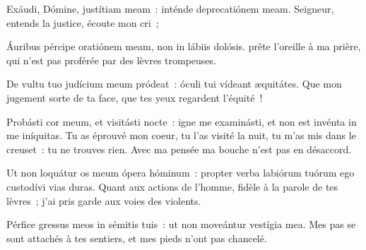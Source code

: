 
\begin{paracol}{2}

\LigneParacol{0cm}
{Exáudi, Dómine, justítiam meam~: \GreStar{} inténde deprecatiónem meam.}
{Seigneur, entends la justice, écoute mon cri~;}

\LigneParacol{0.2cm}
{Áuribus pércipe oratiónem meam, \GreStar{} non in lábiis dolósis.}
{prête l'oreille à ma prière, qui n'est pas proférée par des lèvres trompeuses. }

\LigneParacol{0.2cm}
{De vultu tuo judícium meum pródeat~: \GreStar{} óculi tui vídeant æquitátes.}
{Que mon jugement sorte de ta face, que tes yeux regardent l'équité~! }

\LigneParacol{0.2cm}
{Probásti cor meum, et visitásti nocte~: \GreStar{} igne me examinásti, et non est invénta in me iníquitas.}
{Tu as éprouvé mon coeur, tu l'as visité la nuit, tu m'as mis dans le creuset~: tu ne trouves rien. Avec ma pensée ma bouche n'est pas en désaccord. }

\LigneParacol{0.2cm}
{Ut non loquátur os meum ópera hóminum~: \GreStar{} propter verba labiórum tuórum ego custodívi vias duras.}
{Quant aux actions de l'homme, fidèle à la parole de tes lèvres~; j'ai pris garde aux voies des violents. }

\LigneParacol{0.2cm}
{Pérfice gressus meos in sémitis tuis~: \GreStar{} ut non moveántur vestígia mea.}
{Mes pas se sont attachés à tes sentiers, et mes pieds n'ont pas chancelé. }

\end{paracol}
\Gloria
